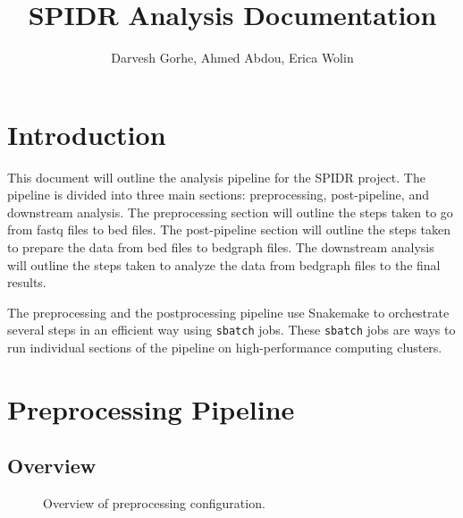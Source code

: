 \documentclass{article}
\title{SPIDR Analysis Documentation}
\author{Darvesh Gorhe, Ahmed Abdou, Erica Wolin}
\begin{document}
    \maketitle
    \tableofcontents

    \section{Introduction}
    This document will outline the analysis pipeline for the SPIDR project. The pipeline is divided into three main sections: preprocessing, post-pipeline, and downstream analysis. The preprocessing section will outline the steps taken to go from fastq files to bed files. The post-pipeline section will outline the steps taken to prepare the data from bed files to bedgraph files. The downstream analysis will outline the steps taken to analyze the data from bedgraph files to the final results.
    \vspace{5mm}

    \noindent The preprocessing and the postprocessing pipeline use Snakemake to orchestrate several steps in an efficient way using \texttt{sbatch} jobs. These \texttt{sbatch} jobs are ways to run individual sections of the pipeline on high-performance computing clusters.

    \section{Preprocessing Pipeline}
    \subsection{Overview}

    \begin{figure}[ht!]
        \centering
        \caption[short]{Overview of preprocessing configuration.}
    \end{figure}
\end{document}
